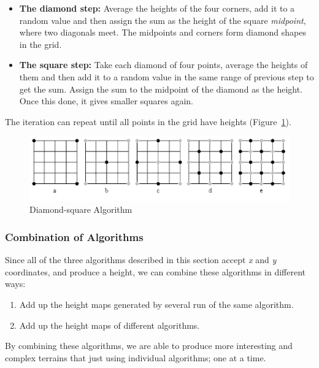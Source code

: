 \begin{itemize}
	\item \textbf{The diamond step:} Average the heights of the four corners, add it to a random value and then assign the sum as the height of the square \textit{midpoint}, where two diagonals meet. The midpoints and corners form diamond shapes in the grid.
	\item \textbf{The square step:} Take each diamond of four points, average the heights of them and then add it to a random value in the same range of previous step to get the sum. Assign the sum to the midpoint of the diamond as the height. Once this done, it gives smaller squares again.
\end{itemize}

The iteration can repeat until all points in the grid have heights (Figure~\ref{fig:dsa}).

\begin{figure}
	\center
	\includegraphics[scale=0.5]{images/dsa.png}
	\caption{Diamond-square Algorithm}
	\label{fig:dsa}
\end{figure}

\subsubsection{Combination of Algorithms}

Since all of the three algorithms described in this section accept \textit{x} and \textit{y} coordinates, and produce a height, we can combine these algorithms in different ways:

\begin{enumerate}
	\item Add up the height maps generated by several run of the same algorithm.
	\item Add up the height maps of different algorithms.
\end{enumerate}

By combining these algorithms, we are able to produce more interesting and complex terrains that just using individual algorithms; one at a time.

